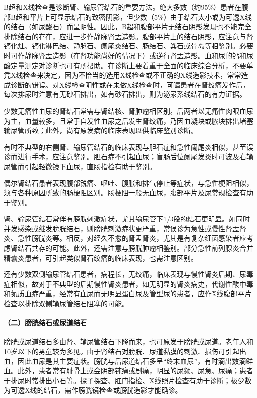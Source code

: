 B超和X线检查是诊断肾、输尿管结石的重要方法。绝大多数（约95\%）患者在腹部B超和平片上可显示结石的致密阴影，但少数（5\%）由于结石太小或为可透X线的结石（如尿酸石）而呈阴性。因此，B超和腹部平片无结石阴影发现也不能完全排除结石的存在，应进一步作静脉肾盂造影。腹部平片上的结石阴影，应注意与肾钙化灶、钙化淋巴结、静脉石、阑尾炎结石、肠结石、粪石或骨岛等相鉴别。必要时可作静脉肾盂造影（在肾功能尚好的情况下）或逆行肾盂造影。血和尿的钙和尿酸定量测定对诊断也可有所帮助。在诊断上要着重于全面的临床综合分析，不要单凭X线检查来决定，因为不恰当的选用X线检查或不正确的X线造影技术，常常造成诊断的错误。对X线检查阴性或在未做X线检查时，可嘱患者在肾绞痛发作后，每次排尿时注意有无砂石排出，如有砂石排出，则为泌尿系线结石的有力证据。

少数无痛性血尿的肾结石常需与肾结核、肾肿瘤相区别。后两者以无痛性肉眼血尿为主，血量较多，且常于自发性血尿之后发生肾绞痛，乃因血凝块或脓块排出堵塞输尿管所致；此外，尚有原发病的临床表现以供临床鉴别诊断。

有时不典型的右侧肾、输尿管结石的临床表现与胆石症和急性阑尾炎相似，甚至误诊而进行手术，应注意鉴别。胆石症不引起血尿；盲肠后位阑尾发炎时可波及右输尿管而引起轻微镜下血尿，直肠指检有助于鉴别。

偶尔肾结石患者表现腹部锐痛、呕吐、腹胀和排气停止等症状，与急性梗阻相似，须与各种原因所致的肠梗阻区别。肠梗阻一般无血尿，腹部平片及尿常规检查有助于鉴别。

肾、输尿管结石常伴有膀胱刺激症状，尤其输尿管下1/3段的结石更明显。如同时并发感染或继发膀胱结石，则膀胱刺激症状更严重，常误诊为急性或慢性肾盂肾炎、急性膀胱炎等。相反，对经久不愈的肾盂肾炎，尤其是有复杂细菌感染者应考虑肾结石共存的可能。此外，还需注意与膀胱肿瘤相鉴别。部分急性前列腺炎合并精囊炎患者，可引起类似肾石绞痛的临床表现，也需注意区别。

还有少数双侧输尿管结石患者，病程长，无绞痛，临床表现与慢性肾炎后期、尿毒症相似，故对于不典型的后期慢性肾炎患者，如无明显的肾炎病史，代谢性酸中毒和氮质血症严重，经常有血尿而无明显蛋白尿及管型尿的患者，应作X线腹部平片检查以排除双侧输尿管结石阻塞的可能。

\paragraph{（二）膀胱结石或尿道结石}

膀胱或尿道结石多由肾、输尿管结石下降而来，也可原发于膀胱或尿道。老年人和10岁以下的男童较为多见。由于肾结石对膀胱、尿道黏膜的刺激、损伤可引起出血，因此血尿是其主要症状。膀胱与后尿道结石多呈“终末血尿”，有时滴出数滴鲜血。此外，患者常有耻骨上或会阴部钝痛或剧痛，明显的尿频、尿急、尿痛；患者于排尿时常排出小石等。探子探查、肛门指检、X线照片检查有助于诊断；极少数为可透X线的结石，需作膀胱镜检查或膀胱造影才能确诊。

